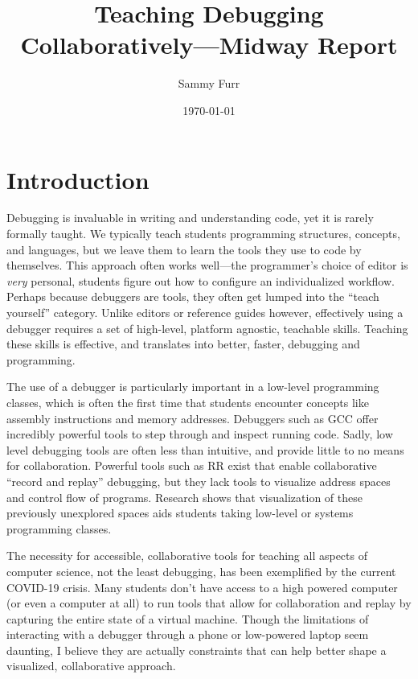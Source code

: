 \documentclass[12pt]{article}
\author{Sammy Furr}
\title{Teaching Debugging Collaboratively---Midway Report}
\date{\today}
\begin{document}
\begin{titlepage}
\maketitle
\end{titlepage}

\section{Introduction}

Debugging is invaluable in writing and understanding code, yet it is
rarely formally taught\cite{doi:10.1080/08993400802114581}.  We
typically teach students programming structures, concepts, and
languages, but we leave them to learn the tools they use to code by
themselves.  This approach often works well---the programmer's choice
of editor is \textit{very} personal, students figure out how to
configure an individualized workflow.  Perhaps because debuggers are
tools, they often get lumped into the ``teach yourself'' category.
Unlike editors or reference guides however, effectively using a
debugger requires a set of high-level, platform agnostic, teachable
skills.  Teaching these skills is effective, and translates into
better, faster, debugging and
programming\cite{10.1145/3286960.3286970}\cite{10.1145/3361721.3361724}.\par

The use of a debugger is particularly important in a low-level
programming classes, which is often the first time that students
encounter concepts like assembly instructions and memory addresses.
Debuggers such as GCC offer incredibly powerful tools to step through
and inspect running code.  Sadly, low level debugging tools are often
less than intuitive, and provide little to no means for collaboration.
Powerful tools such as RR exist that enable collaborative ``record and
replay'' debugging\cite{DBLP:journals/corr/OCallahanJFHNP17}, but they
lack tools to visualize address spaces and control flow of programs.
Research shows that visualization of these previously unexplored
spaces aids students taking low-level or systems programming
classes\cite{10.1145/3328778.3366894}.\par

The necessity for accessible, collaborative tools for teaching all
aspects of computer science, not the least debugging, has been
exemplified by the current COVID-19 crisis.  Many students don't have
access to a high powered computer (or even a computer at all) to run
tools that allow for collaboration and replay by capturing the entire
state of a virtual machine\cite{10.1145/2843859.2843867}.  Though the
limitations of interacting with a debugger through a phone or
low-powered laptop seem daunting, I believe they are actually
constraints that can help better shape a visualized, collaborative
approach.\par
\end{document}
